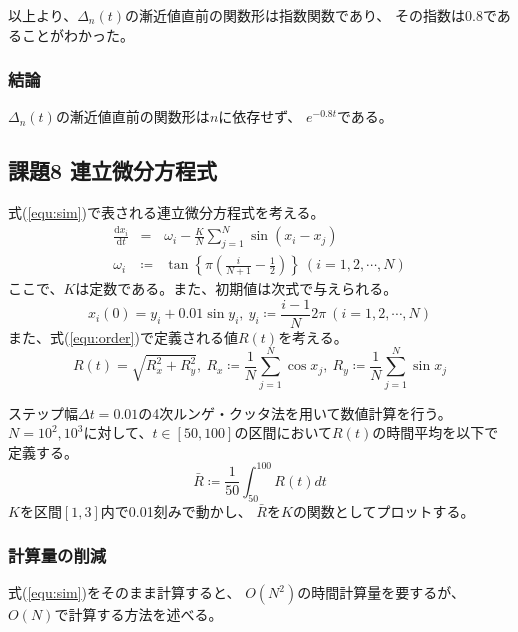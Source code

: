 \documentclass[a4j, titlepage]{jsarticle}
\numberwithin{equation}{section}
\begin{document}
            以上より、$\Delta_n(t)$の漸近値直前の関数形は指数関数であり、
            その指数は0.8であることがわかった。

        \subsubsection{結論}
            $\Delta_n(t)$の漸近値直前の関数形は$n$に依存せず、
            $e^{-0.8t}$である。

    \subsection{課題8 連立微分方程式}
        式(\ref{equ:sim})で表される連立微分方程式を考える。
        \begin{eqnarray}
            \frac{\mathrm{d}x_i}{\mathrm{d}t} &=& \omega_i - \frac{K}{N}\sum^N_{j=1}\sin(x_i-x_j) \label{equ:sim} \\
            \omega_i &\coloneqq& \tan\left\{\pi\left(\frac{i}{N + 1} - \frac{1}{2}\right)\right\} \ (i = 1, 2, \cdots, N) \nonumber
        \end{eqnarray}
        ここで、$K$は定数である。また、初期値は次式で与えられる。
        \begin{equation*}
            x_i(0) = y_i + 0.01\sin y_i, \ y_i \coloneqq \frac{i - 1}{N}2\pi \ (i = 1, 2, \cdots, N)
        \end{equation*}
        また、式(\ref{equ:order})で定義される値$R(t)$を考える。
        \begin{equation}
            R(t) = \sqrt{R_x^2 + R_y^2}, \ R_x \coloneqq \frac{1}{N}\sum^N_{j=1}\cos x_j, \ R_y \coloneqq \frac{1}{N}\sum^N_{j=1}\sin x_j \label{equ:order}
        \end{equation}

        ステップ幅$\Delta t = 0.01$の4次ルンゲ・クッタ法を用いて数値計算を行う。
        $N=10^2, 10^3$に対して、$t\in[50, 100]$の区間において$R(t)$の時間平均を以下で定義する。
        \begin{equation*}
            \bar{R} \coloneqq \frac{1}{50}\int^{100}_{50}R(t)dt
        \end{equation*}
        $K$を区間$[1, 3]$内で0.01刻みで動かし、
        $\bar{R}$を$K$の関数としてプロットする。

        \subsubsection{計算量の削減}
            式(\ref{equ:sim})をそのまま計算すると、
            $O(N^2)$の時間計算量を要するが、
            $O(N)$で計算する方法を述べる。
\end{document}
